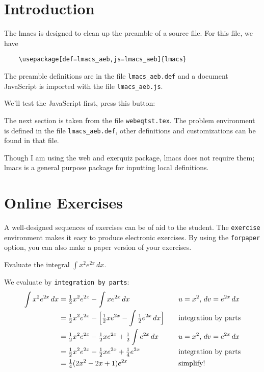 \documentclass{article}
\begin{document}
\maketitle

\tableofcontents


\section{Introduction}

The \textsf{lmacs} is designed to clean up the preamble of a source file.
For this file, we have
\begin{verbatim}
    \usepackage[def=lmacs_aeb,js=lmacs_aeb]{lmacs}
\end{verbatim}
The preamble definitions are in the file \texttt{lmacs\_aeb.def} and a
document JavaScript is imported with the file \texttt{lmacs\_aeb.js}.

\medskip\noindent We'll test the JavaScript first, press this button:

\medskip\noindent The next section is taken from the file
\texttt{webeqtst.tex}. The problem environment is defined in the file
\texttt{lmacs\_aeb.def}, other definitions and customizations can be found
in that file.

\medskip\noindent Though I am using the \textsf{web} and \textsf{exerquiz} package, lmacs
does not require them; \textsf{lmacs} is a general purpose package for inputting
local definitions.

\section{Online Exercises}

A well-designed sequences of exercises can be of aid to the
student.  The \texttt{exercise} environment makes it easy to
produce electronic exercises.  By using the \texttt{forpaper}
option, you can also make a paper version of your exercises.

\begin{exercise}
Evaluate the integral \(\displaystyle\int x^2 e^{2x}\,dx\).
\begin{solution}
We evaluate by \texttt{integration by parts}:\normalsize
\begin{alignat*}{2}
 \int x^2 e^{2x}\,dx &
   = \tfrac12 x^2 e^{2x} - \int x e^{2x}\,dx &&\quad
           \text{$u=x^2$, $dv=e^{2x}\,dx$}\\&
   = \tfrac12 x^2 e^{2x} -
           \Bigl[\tfrac12 x e^{2x}-\int \tfrac12 e^{2x}\,dx\Bigr] &&\quad
           \text{integration by parts}\\&
   = \tfrac12 x^2 e^{2x} - \tfrac12 x e^{2x} + \tfrac12\int e^{2x}\,dx &&\quad
           \text{$u=x^2$, $dv=e^{2x}\,dx$}\\&
   = \tfrac12 x^2 e^{2x} - \tfrac12 x e^{2x} + \tfrac14 e^{2x} &&\quad
           \text{integration by parts}\\&
   = \tfrac14(2x^2-2x+1)e^{2x} &&\quad
           \text{simplify!}
\end{alignat*}
\end{solution}
\end{exercise}
\end{document}
